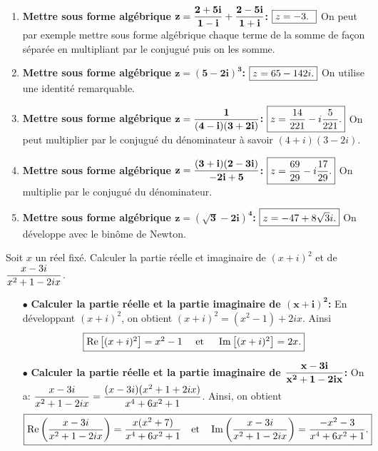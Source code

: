 \documentclass[a4paper, 11pt]{article}
\begin{document}
\begin{correction}
\begin{enumerate}
\item  \textbf{Mettre sous forme alg\'ebrique $\mathbf{z=\displaystyle\frac{2+5i}{1-i}+\displaystyle\frac{2-5i}{1+i}}$:}  $\fbox{$z=-3$. }$ On peut par exemple mettre sous forme alg\'ebrique chaque terme de la somme de fa\c{c}on s\'epar\'ee en multipliant par le conjugu\'e puis on les somme.
\item \textbf{Mettre sous forme alg\'ebrique $\mathbf{z=(5-2i)^3}$:}  $\fbox{$z=65-142 i.$}$ On utilise une identit\'e remarquable.
\item \textbf{Mettre sous forme alg\'ebrique $\mathbf{z= \displaystyle\frac{1}{(4-i)(3+2i)}}$:}  $\fbox{$z=\displaystyle\frac{14}{221}-i\displaystyle\frac{5}{221}$.}$ On peut multiplier par le conjugu\'e du d\'enominateur \`{a} savoir $(4+i)(3-2i)$.
\item \textbf{Mettre sous forme alg\'ebrique $\mathbf{z=\displaystyle\frac{(3+i)(2-3i)}{-2i+5}}$:}  $\fbox{$z=\displaystyle\frac{69}{29}-i\displaystyle\frac{17}{29}$.}$  On multiplie par le conjugu\'e du d\'enominateur.
\item \textbf{Mettre sous forme alg\'ebrique $\mathbf{z=(\sqrt{3}-2i)^4}$:}  $\fbox{$z=-47+8\sqrt{3}i$.}$ On d\'eveloppe avec le bin\^{o}me de Newton.
\end{enumerate}
\end{correction}







\begin{exercice}  \;
Soit $x$ un r\'eel fix\'e. Calculer la partie r\'eelle et imaginaire de 
$(x+i)^2$ et de $\displaystyle\frac{x-3i}{x^2+1-2ix}$.
\end{exercice}


\begin{correction}   \;
\begin{itemize}
\item[$\bullet$] \textbf{Calculer la partie r\'eelle et la partie imaginaire de $\mathbf{(x+i)^2}$:}
En d\'eveloppant $(x+i)^2$, on obtient $(x+i)^2=(x^2-1)+2i x$. Ainsi
$$\fbox{$\operatorname{Re}{\left\lbrack(x+i)^2\right\rbrack}=x^2-1\quad \text{ et } \quad \operatorname{Im}{\left\lbrack(x+i)^2\right\rbrack}=2x.$}$$
\item[$\bullet$]  \textbf{Calculer la partie r\'eelle et la partie imaginaire de $\mathbf{\displaystyle\frac{x-3i}{x^2+1-2i x}}$:}
On a: $\displaystyle\frac{x-3i}{x^2+1-2i x}=\displaystyle\frac{(x-3i)(x^2+1+2i x)}{x^4+6x^2+1}$.
Ainsi, on obtient
$$\fbox{$\operatorname{Re}{ \left(\displaystyle\frac{x-3i}{x^2+1-2i x}\right)}=\displaystyle\frac{x(x^2+7)}{x^4+6x^2+1}\quad\hbox{et}\quad \operatorname{Im}{\left(\displaystyle\frac{x-3i}{x^2+1-2i x}\right)}=\displaystyle\frac{-x^2-3}{x^4+6x^2+1}.$}$$
\end{itemize}
\end{correction}
\end{document}
